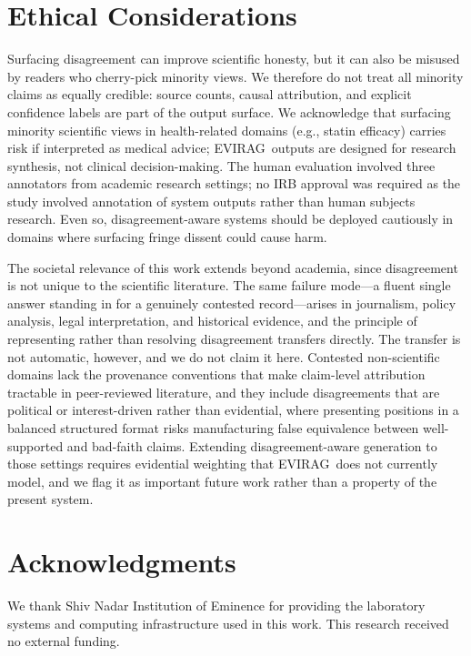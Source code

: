 \documentclass[11pt]{article}
\newcommand{\system}{\textsc{EVIRAG}\xspace}
\begin{document}
\section*{Ethical Considerations}
\label{sec:ethics}

Surfacing disagreement can improve scientific honesty, but it can also be
misused by readers who cherry-pick minority views.  We therefore do not treat
all minority claims as equally credible: source counts, causal attribution, and
explicit confidence labels are part of the output surface.  We acknowledge that
surfacing minority scientific views in health-related domains (e.g., statin
efficacy) carries risk if interpreted as medical advice; \system\ outputs are
designed for research synthesis, not clinical decision-making.
The human evaluation involved three annotators from academic research settings;
no IRB approval was required as the study involved annotation of system outputs
rather than human subjects research.
Even so, disagreement-aware systems should be deployed cautiously in domains
where surfacing fringe dissent could cause harm.

The societal relevance of this work extends beyond academia, since disagreement
is not unique to the scientific literature.  The same failure mode---a fluent
single answer standing in for a genuinely contested record---arises in
journalism, policy analysis, legal interpretation, and historical evidence, and
the principle of representing rather than resolving disagreement transfers
directly.  The
transfer is not automatic, however, and we do not claim it here.  Contested
non-scientific domains lack the provenance conventions that make claim-level
attribution tractable in peer-reviewed literature, and they include
disagreements that are political or interest-driven rather than evidential,
where presenting positions in a balanced structured format risks manufacturing
false equivalence between well-supported and bad-faith claims.  Extending
disagreement-aware generation to those settings requires evidential weighting
that \system\ does not currently model, and we flag it as important future work
rather than a property of the present system.

\section*{Acknowledgments}

We thank Shiv Nadar Institution of Eminence for providing the laboratory
systems and computing infrastructure used in this work.  This research received
no external funding.
\end{document}
